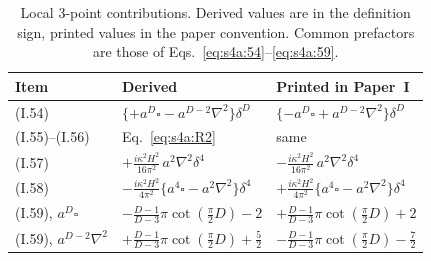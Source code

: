 \documentclass[aps,prd,onecolumn,10pt,nofootinbib,floatfix]{revtex4-2}
\newcommand{\PI}{Paper~I}
\newcommand{\eqI}[1]{(I.#1)}
\begin{document}
\begin{table}[htbp]
\caption{Local 3-point contributions. Derived values are in the definition sign, printed values in the
paper convention. Common prefactors are those of Eqs.~\eqref{eq:s4a:54}--\eqref{eq:s4a:59}.}
\label{tab:s4a:loccmp}
\renewcommand{\arraystretch}{1.3}
\begin{ruledtabular}
\begin{tabular}{lll}
Item & Derived & Printed in \PI\\
\hline
\eqI{54} & $\{+a^D\square-a^{D-2}\nabla^2\}\delta^D$ & $\{-a^D\square+a^{D-2}\nabla^2\}\delta^D$\\
\eqI{55}--\eqI{56} & Eq.~\eqref{eq:s4a:R2} & same\\
\eqI{57} & $+\frac{i\kappa^2H^2}{16\pi^2}\,a^2\nabla^2\delta^4$ & $-\frac{i\kappa^2H^2}{16\pi^2}\,a^2\nabla^2\delta^4$\\
\eqI{58} & $-\frac{i\kappa^2H^2}{4\pi^2}\{a^4\square-a^2\nabla^2\}\delta^4$ & $+\frac{i\kappa^2H^2}{4\pi^2}\{a^4\square-a^2\nabla^2\}\delta^4$\\
\eqI{59}, $a^D\square$ & $-\frac{D-1}{D-3}\pi\cot(\frac\pi2D)-2$ & $+\frac{D-1}{D-3}\pi\cot(\frac\pi2D)+2$\\
\eqI{59}, $a^{D-2}\nabla^2$ & $+\frac{D-1}{D-3}\pi\cot(\frac\pi2D)+\frac52$ & $-\frac{D-1}{D-3}\pi\cot(\frac\pi2D)-\frac72$\\
\end{tabular}
\end{ruledtabular}
\end{table}
\end{document}

